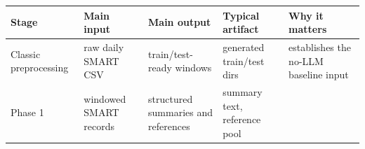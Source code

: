 \documentclass[
  11pt,
  a4paper]{article}
\begin{document}
\begin{longtable}[]{@{}lllll@{}}
\toprule
\begin{minipage}[b]{0.17\columnwidth}\raggedright
Stage\strut
\end{minipage} & \begin{minipage}[b]{0.17\columnwidth}\raggedright
Main input\strut
\end{minipage} & \begin{minipage}[b]{0.17\columnwidth}\raggedright
Main output\strut
\end{minipage} & \begin{minipage}[b]{0.17\columnwidth}\raggedright
Typical artifact\strut
\end{minipage} & \begin{minipage}[b]{0.17\columnwidth}\raggedright
Why it matters\strut
\end{minipage}\tabularnewline
\midrule
\endhead
\begin{minipage}[t]{0.17\columnwidth}\raggedright
Classic preprocessing\strut
\end{minipage} & \begin{minipage}[t]{0.17\columnwidth}\raggedright
raw daily SMART CSV\strut
\end{minipage} & \begin{minipage}[t]{0.17\columnwidth}\raggedright
train/test-ready windows\strut
\end{minipage} & \begin{minipage}[t]{0.17\columnwidth}\raggedright
generated train/test dirs\strut
\end{minipage} & \begin{minipage}[t]{0.17\columnwidth}\raggedright
establishes the no-LLM baseline input\strut
\end{minipage}\tabularnewline
\begin{minipage}[t]{0.17\columnwidth}\raggedright
Phase 1\strut
\end{minipage} & \begin{minipage}[t]{0.17\columnwidth}\raggedright
windowed SMART records\strut
\end{minipage} & \begin{minipage}[t]{0.17\columnwidth}\raggedright
structured summaries and references\strut
\end{minipage} & \begin{minipage}[t]{0.17\columnwidth}\raggedright
summary text, reference pool\strut
\end{minipage} & \begin{minipage}[t]{0.17\columnwidth}\raggedright

\end{minipage}
\end{longtable}
\end{document}
